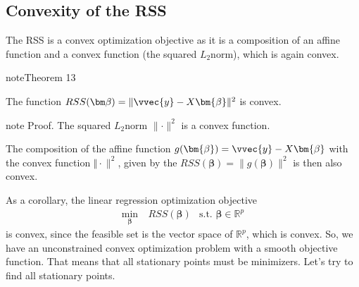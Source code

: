 \documentclass[letterpaper,10pt,english]{jupyterBook}
\begin{document}
\subsection{Convexity of the RSS}
\label{\detokenize{regression_optimization:convexity-of-the-rss}}
\sphinxAtStartPar
The RSS is a convex optimization objective as it is a composition of an affine function and a convex function (the squared \(L_2\)\sphinxhyphen{}norm), which is again convex.
\label{regression_optimization:theorem-0}
\begin{sphinxadmonition}{note}{Theorem 13}



\sphinxAtStartPar
The function \(RSS(\bm\beta)=\lVert \vvec{y}-X\bm{\beta}\rVert^2\) is convex.
\end{sphinxadmonition}

\begin{sphinxadmonition}{note}
\sphinxAtStartPar
Proof. The squared \(L_2\)\sphinxhyphen{}norm \(\lVert\cdot\rVert^2\) is a convex function.

\sphinxAtStartPar
The composition of the affine function \(g(\bm{\beta})=\vvec{y}-X\bm{\beta}\) with the convex function \(\Vert\cdot\rVert^2\), given by the \(RSS(\bm{\beta})=\lVert g(\bm{\beta})\rVert^2\) is then also convex.
\end{sphinxadmonition}

\sphinxAtStartPar
As a corollary, the linear regression optimization objective
\begin{align*}
    \min_{\bm{\beta}}&\ RSS(\bm{\beta})& \text{s.t. }\bm{\beta}\in\mathbb{R}^p
\end{align*}
\sphinxAtStartPar
is convex, since the feasible set is the vector space of \(\mathbb{R}^p\), which is convex.
So, we have an unconstrained convex optimization problem with a smooth objective function. That means that all stationary points must be minimizers. Let’s try to find all stationary points.
\end{document}
